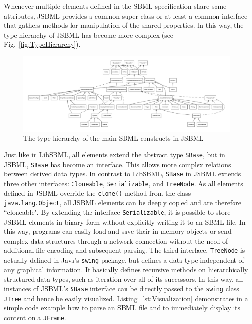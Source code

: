 \documentclass[
  letterpaper,
  11pt,
  headsepline,
  pointlessnumbers,
  tablecaptionabove,
  headinclude,
  appendixprefix,
  idxtotoc,
  bibtotoc,
  titlepage
]{scrartcl}
\begin{document}
Whenever multiple elements defined in the SBML specification share some attributes,
JSBML provides a common super class or at least a common interface that gathers methods
for manipulation of the shared properties. In this way, the type hierarchy of JSBML has
become more complex (see Fig.~\vref{fig:TypeHierarchy}). 
\begin{figure}
\centering
\includegraphics[width=\textwidth]{FullTypeHierarchy}
\caption[The type hierarchy in JSBML]{The type hierarchy of the main SBML constructs in JSBML}
\label{fig:TypeHierarchy}
\end{figure}
Just like in LibSBML, all elements extend the abstract type \verb!SBase!, but in JSBML, 
\verb!SBase! has become an interface. This allows more complex relations between derived 
data types. In contrast to LibSBML, \verb!SBase! in JSBML extends three other interfaces: 
\verb!Cloneable!, \verb!Serializable!, and \verb!TreeNode!. As all elements defined in JSBML 
override the \verb!clone()! method from the class \verb!java.lang.Object!, all JSBML 
elements can be deeply copied and are therefore ``cloneable". By extending the interface
\verb!Serializable!, it is possible to store JSBML elements in binary form without explicitly 
writing it to an SBML file. In this way, programs can easily load and save their in-memory
objects or send complex data structures through a network connection without the need of
additional file encoding and subsequent parsing. 
The third interface, \verb!TreeNode! is actually defined in Java's \verb!swing! package, but
defines a data type independent of any graphical information. It basically defines recursive
methods on hierarchically structured data types, such as iteration over all of its successors.
In this way, all instances of JSBML's \verb!SBase! interface can be directly passed to the
\verb!swing! class \verb!JTree! and hence be easily visualized. Listing~\vref{lst:Visualization}
demonstrates in a simple code example how to parse an SBML file and to immediately display
its content on a \verb!JFrame!.

\end{document}
